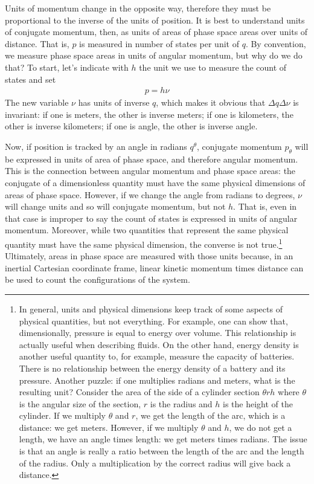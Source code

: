 Units of momentum change in the opposite way, therefore they must be proportional to the inverse of the units of position. It is best to understand units of conjugate momentum, then, as units of areas of phase space areas over units of distance. That is, $p$ is measured in number of states per unit of $q$. By convention, we measure phase space areas in units of angular momentum, but why do we do that? To start, let's indicate with $h$ the unit we use to measure the count of states and set
\begin{equation}
	\begin{aligned}
		p = h \nu
	\end{aligned}
\end{equation}
The new variable $\nu$ has units of inverse $q$, which makes it obvious that $\Delta q \Delta \nu$ is invariant: if one is meters, the other is inverse meters; if one is kilometers, the other is inverse kilometers; if one is angle, the other is inverse angle.

Now, if position is tracked by an angle in radians $q^\theta$, conjugate momentum $p_\theta$ will be expressed in units of area of phase space, and therefore angular momentum. This is the connection between angular momentum and phase space areas: the conjugate of a dimensionless quantity must have the same physical dimensions of areas of phase space. However, if we change the angle from radians to degrees, $\nu$ will change units and so will conjugate momentum, but not $h$. That is, even in that case is improper to say the count of states is expressed in units of angular momentum. Moreover, while two quantities that represent the same physical quantity must have the same physical dimension, the converse is not true.\footnote{In general, units and physical dimensions keep track of some aspects of physical quantities, but not everything. For example, one can show that, dimensionally, pressure is equal to energy over volume. This relationship is actually useful when describing fluids. On the other hand, energy density is another useful quantity to, for example, measure the capacity of batteries. There is no relationship between the energy density of a battery and its pressure. Another puzzle: if one multiplies radians and meters, what is the resulting unit? Consider the area of the side of a cylinder section $\theta r h$ where $\theta$ is the angular size of the section, $r$ is the radius and $h$ is the height of the cylinder. If we multiply $\theta$ and $r$, we get the length of the arc, which is a distance: we get meters. However, if we multiply $\theta$ and $h$, we do not get a length, we have an angle times length: we get meters times radians. The issue is that an angle is really a ratio between the length of the arc and the length of the radius. Only a multiplication by the correct radius will give back a distance.} Ultimately, areas in phase space are measured with those units because, in an inertial Cartesian coordinate frame, linear kinetic momentum times distance can be used to count the configurations of the system.

